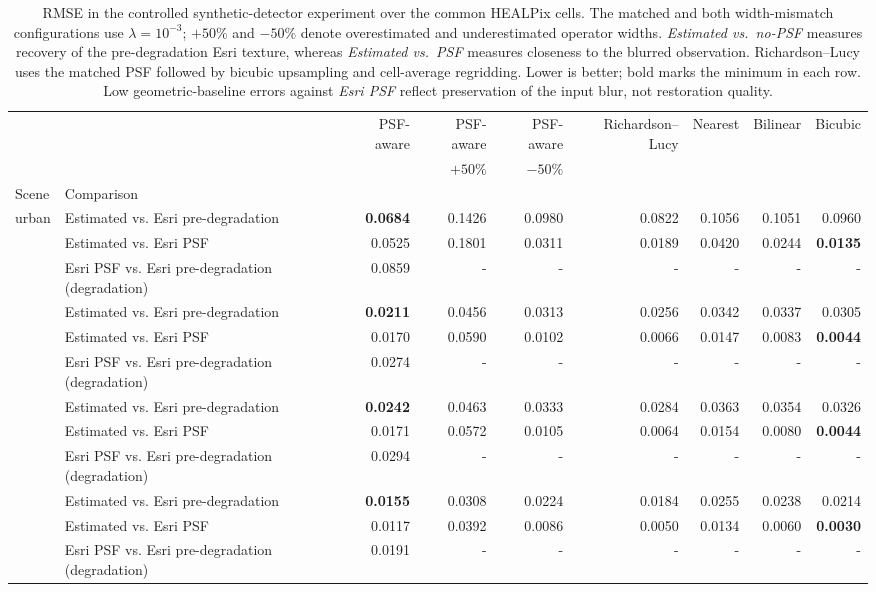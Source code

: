 \documentclass[journal]{IEEEtran}
\newcommand{\healpix}{HEALPix\xspace}
\newcommand{\psf}{PSF\xspace}
\begin{document}
\begin{table}[t]
\centering
\caption{RMSE in the controlled synthetic-detector experiment over
the common \healpix cells. The matched and both width-mismatch
configurations use $\lambda=10^{-3}$; $+50\%$ and $-50\%$ denote
overestimated and underestimated operator widths. \emph{Estimated
vs.\ no-\psf} measures recovery of the pre-degradation Esri texture,
whereas \emph{Estimated vs.\ \psf} measures closeness to the blurred
observation. Richardson--Lucy uses the matched PSF followed by
bicubic upsampling and cell-average regridding. Lower is better;
bold marks the minimum in each row. Low geometric-baseline errors
against \emph{Esri PSF} reflect preservation of the input blur, not
restoration quality.}
\label{tab:synthetic_metrics}
\setlength{\tabcolsep}{4pt}
\begin{tabular}{llrrrrrrr}
\toprule
 &  & PSF-aware & PSF-aware & PSF-aware & Richardson--Lucy & Nearest & Bilinear & Bicubic \\
 &  &  & $+50\%$ & $-50\%$ & &  &  &  \\
Scene & Comparison &  &  &  &  &  &  &  \\
\midrule
\multirow[t]{3}{*}{urban} & Estimated vs. Esri pre-degradation & \textbf{0.0684} & 0.1426 & 0.0980 & 0.0822 & 0.1056 & 0.1051 & 0.0960 \\
 & Estimated vs. Esri PSF & 0.0525 & 0.1801 & 0.0311 & 0.0189 & 0.0420 & 0.0244 & \textbf{0.0135} \\
 & Esri PSF vs. Esri pre-degradation (degradation) & 0.0859 & - & - & - & - & - & - \\
\cmidrule(lr){1-9}\addlinespace[2pt]
\multirow[t]{3}{*}{water} & Estimated vs. Esri pre-degradation & \textbf{0.0211} & 0.0456 & 0.0313 & 0.0256 & 0.0342 & 0.0337 & 0.0305 \\
 & Estimated vs. Esri PSF & 0.0170 & 0.0590 & 0.0102 & 0.0066 & 0.0147 & 0.0083 & \textbf{0.0044} \\
 & Esri PSF vs. Esri pre-degradation (degradation) & 0.0274 & - & - & - & - & - & - \\
\cmidrule(lr){1-9}\addlinespace[2pt]
\multirow[t]{3}{*}{forest} & Estimated vs. Esri pre-degradation & \textbf{0.0242} & 0.0463 & 0.0333 & 0.0284 & 0.0363 & 0.0354 & 0.0326 \\
 & Estimated vs. Esri PSF & 0.0171 & 0.0572 & 0.0105 & 0.0064 & 0.0154 & 0.0080 & \textbf{0.0044} \\
 & Esri PSF vs. Esri pre-degradation (degradation) & 0.0294 & - & - & - & - & - & - \\
\cmidrule(lr){1-9}\addlinespace[2pt]
\multirow[t]{3}{*}{agriculture} & Estimated vs. Esri pre-degradation & \textbf{0.0155} & 0.0308 & 0.0224 & 0.0184 & 0.0255 & 0.0238 & 0.0214 \\
 & Estimated vs. Esri PSF & 0.0117 & 0.0392 & 0.0086 & 0.0050 & 0.0134 & 0.0060 & \textbf{0.0030} \\
 & Esri PSF vs. Esri pre-degradation (degradation) & 0.0191 & - & - & - & - & - & - \\
\bottomrule
\end{tabular}
\end{table}
\end{document}
